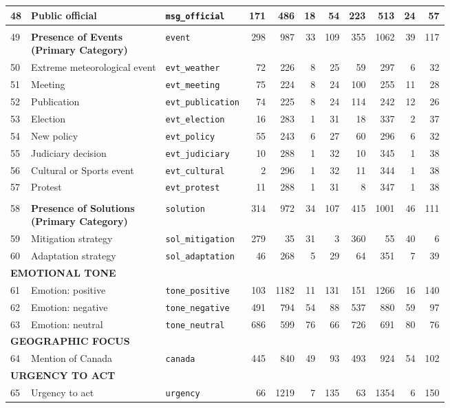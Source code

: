 \begin{longtable}{p{0.5cm}p{4.0cm}p{3.0cm}rrrrrrrr}
48 & Public official & \texttt{msg\_official} & 171 & 486 & 18 & 54 & 223 & 513 & 24 & 57 \\
\midrule
\rowcolor{gray!8}
\multicolumn{11}{l}{\textit{Events}} \\
\midrule
49 & \textbf{Presence of Events\newline (Primary Category)} & \texttt{event} & 298 & 987 & 33 & 109 & 355 & 1062 & 39 & 117 \\
\cmidrule(lr){1-11}
50 & Extreme meteorological event & \texttt{evt\_weather} & 72 & 226 & 8 & 25 & 59 & 297 & 6 & 32 \\
51 & Meeting & \texttt{evt\_meeting} & 75 & 224 & 8 & 24 & 100 & 255 & 11 & 28 \\
52 & Publication & \texttt{evt\_publication} & 74 & 225 & 8 & 24 & 114 & 242 & 12 & 26 \\
53 & Election & \texttt{evt\_election} & 16 & 283 & 1 & 31 & 18 & 337 & 2 & 37 \\
54 & New policy & \texttt{evt\_policy} & 55 & 243 & 6 & 27 & 60 & 296 & 6 & 32 \\
55 & Judiciary decision & \texttt{evt\_judiciary} & 10 & 288 & 1 & 32 & 10 & 345 & 1 & 38 \\
56 & Cultural or Sports event & \texttt{evt\_cultural} & 2 & 296 & 1 & 32 & 11 & 344 & 1 & 38 \\
57 & Protest & \texttt{evt\_protest} & 11 & 288 & 1 & 31 & 8 & 347 & 1 & 38 \\
\midrule
\rowcolor{gray!8}
\multicolumn{11}{l}{\textit{Solutions}} \\
\midrule
58 & \textbf{Presence of Solutions\newline (Primary Category)} & \texttt{solution} & 314 & 972 & 34 & 107 & 415 & 1001 & 46 & 111 \\
\cmidrule(lr){1-11}
59 & Mitigation strategy & \texttt{sol\_mitigation} & 279 & 35 & 31 & 3 & 360 & 55 & 40 & 6 \\
60 & Adaptation strategy & \texttt{sol\_adaptation} & 46 & 268 & 5 & 29 & 64 & 351 & 7 & 39 \\
\midrule
\multicolumn{11}{l}{\cellcolor{gray!10}\textbf{EMOTIONAL TONE}} \\
\midrule
61 & Emotion: positive & \texttt{tone\_positive} & 103 & 1182 & 11 & 131 & 151 & 1266 & 16 & 140 \\
62 & Emotion: negative & \texttt{tone\_negative} & 491 & 794 & 54 & 88 & 537 & 880 & 59 & 97 \\
63 & Emotion: neutral & \texttt{tone\_neutral} & 686 & 599 & 76 & 66 & 726 & 691 & 80 & 76 \\
\midrule
\multicolumn{11}{l}{\cellcolor{gray!10}\textbf{GEOGRAPHIC FOCUS}} \\
\midrule
64 & Mention of Canada & \texttt{canada} & 445 & 840 & 49 & 93 & 493 & 924 & 54 & 102 \\
\midrule
\multicolumn{11}{l}{\cellcolor{gray!10}\textbf{URGENCY TO ACT}} \\
\midrule
65 & Urgency to act & \texttt{urgency} & 66 & 1219 & 7 & 135 & 63 & 1354 & 6 & 150 \\
\bottomrule
\end{longtable}